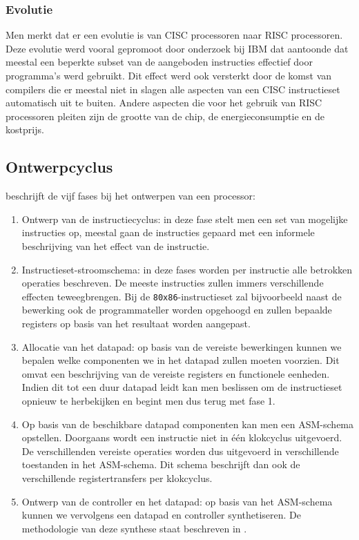 \subsubsection{Evolutie}
Men merkt dat er een evolutie is van CISC processoren naar RISC processoren. Deze evolutie werd vooral gepromoot door onderzoek bij IBM dat aantoonde dat meestal een beperkte subset van de aangeboden instructies effectief door programma's werd gebruikt. Dit effect werd ook versterkt door de komst van compilers die er meestal niet in slagen alle aspecten van een CISC instructieset automatisch uit te buiten. Andere aspecten die voor het gebruik van RISC processoren pleiten zijn de grootte van de chip, de energieconsumptie en de kostprijs.
\subsection{Ontwerpcyclus}
 beschrijft de vijf fases bij het ontwerpen van een processor:
\begin{enumerate}
 \item Ontwerp van de instructiecyclus: in deze fase stelt men een set van mogelijke instructies op, meestal gaan de instructies gepaard met een informele beschrijving van het effect van de instructie.
 \item Instructieset-stroomschema: in deze fases worden per instructie alle betrokken operaties beschreven. De meeste instructies zullen immers verschillende effecten teweegbrengen. Bij de \verb+80x86+-instructieset zal bijvoorbeeld naast de bewerking ook de programmateller worden opgehoogd en zullen bepaalde registers op basis van het resultaat worden aangepast.
 \item Allocatie van het datapad: op basis van de vereiste bewerkingen kunnen we bepalen welke componenten we in het datapad zullen moeten voorzien. Dit omvat een beschrijving van de vereiste registers en functionele eenheden. Indien dit tot een duur datapad leidt kan men beslissen om de instructieset opnieuw te herbekijken en begint men dus terug met fase 1.
 \item Op basis van de beschikbare datapad componenten kan men een ASM-schema opstellen. Doorgaans wordt een instructie niet in \'e\'en klokcyclus uitgevoerd. De verschillenden vereiste operaties worden dus uitgevoerd in verschillende toestanden in het ASM-schema. Dit schema beschrijft dan ook de verschillende registertransfers per klokcyclus.
 \item Ontwerp van de controller en het datapad: op basis van het ASM-schema kunnen we vervolgens een datapad en controller synthetiseren. De methodologie van deze synthese staat beschreven in .
\end{enumerate}
